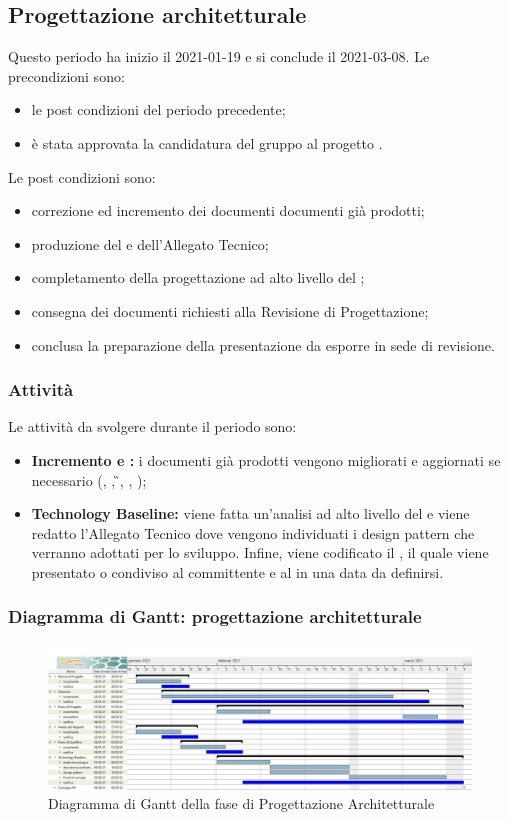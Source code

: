 \newpage
\subsection{Progettazione architetturale}
Questo periodo ha inizio il 2021-01-19 e si conclude il 2021-03-08.
Le precondizioni sono:
\begin{itemize}
	\item le post condizioni del periodo precedente;
	\item è stata approvata la candidatura del gruppo al progetto \NomeProgetto.
\end{itemize}
Le post condizioni sono:
\begin{itemize}
	\item correzione ed incremento dei documenti documenti già prodotti;
	\item produzione del \textit{} e dell'Allegato Tecnico;
	\item completamento della progettazione ad alto livello del ;
	\item consegna dei documenti richiesti alla Revisione di Progettazione; 	
	\item conclusa la preparazione della presentazione da esporre in sede di revisione.
\end{itemize}
\subsubsection{Attività}
Le attività da svolgere durante il periodo sono:
\begin{itemize}
	\item \textbf{Incremento e :} i documenti già prodotti vengono migliorati e aggiornati se necessario (\NdP{}, \PdP{}, \G{}, \PdQ{}, \AdR{});
	\item \textbf{Technology Baseline:} viene fatta un'analisi ad alto livello del  e viene redatto l'Allegato Tecnico dove vengono individuati i design pattern che verranno adottati per lo sviluppo. Infine, viene codificato il \textit{}, il quale viene presentato o condiviso al committente e al  in una data da definirsi.
\end{itemize}
\subsubsection{Diagramma di Gantt: progettazione architetturale}
\begin{figure}[H]
    \centering
    \includegraphics[scale = 0.25]{components/img/progettazione_architetturale.jpg}
    \caption{Diagramma di Gantt della fase di Progettazione Architetturale}
    \label{fig:Diagramma di Gantt, fase di Progettazione Architetturale}
\end{figure}

